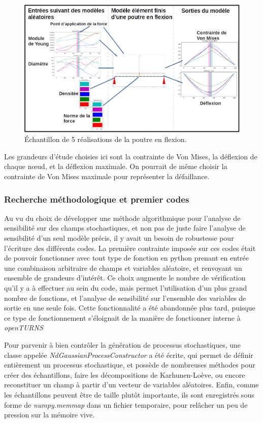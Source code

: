 \documentclass[a4paper,10pt]{article}
\begin{document}
\begin{figure}[H]
   \centering   
   \includegraphics[width=\linewidth]{bending_beam_schema.png}
      \caption{Échantillon de 5 réalisations de la poutre en flexion.}
         \label{beamExperience}
\end{figure}

Les grandeurs d'étude choisies ici sont la contrainte de Von Mises, la déflexion de chaque nœud, et la déflexion maximale. On pourrait de même choisir la contrainte de Von Mises maximale pour représenter la défaillance. \bigskip


\subsubsection{Recherche méthodologique et premier codes }

Au vu du choix de développer une méthode algorithmique pour l'analyse de sensibilité sur des champs stochastiques, et non pas de juste faire l'analyse de sensibilité d'un seul modèle précis, il y avait un besoin de robustesse pour l'écriture des différents codes. La première contrainte imposée sur ces codes était de pouvoir fonctionner avec tout type de fonction en python prenant en entrée une combinaison arbitraire de champs et variables aléatoire, et renvoyant un ensemble de grandeurs d'intérêt.
Ce choix augmente le nombre de vérification qu'il y a à effectuer au sein du code, mais permet l'utilisation d'un plus grand nombre de fonctions, et l'analyse de sensibilité sur l'ensemble des variables de sortie en une seule fois. Cette fonctionnalité a été abandonnée plus tard, puisque ce type de fonctionnement s'éloignait de la manière de fonctionner interne à \textit{openTURNS}
\smallskip

Pour parvenir à bien contrôler la génération de processus stochastiques, une classe appelée \textit{NdGaussianProcessConstructor} a été écrite, qui permet de définir entièrement un processus stochastique, et possède de nombreuses méthodes pour créer des échantillons, faire les décompositions de Karhunen-Loève, ou encore reconstituer un champ à partir d'un vecteur de variables aléatoires. Enfin, comme les échantillons peuvent être de taille plutôt importante, ils sont enregistrés sous forme de \textit{numpy.memmap} dans un fichier temporaire, pour relâcher un peu de pression sur la mémoire vive. \par \bigskip
\end{document}
